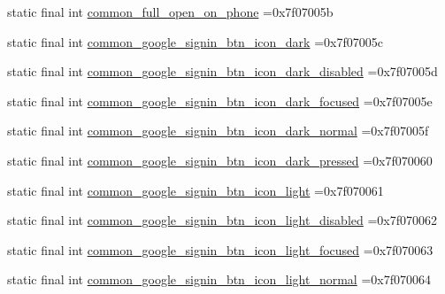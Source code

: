 \begin{DoxyCompactItemize}
\item 
static final int \mbox{\hyperlink{classbr_1_1unb_1_1cic_1_1mp_1_1marketmaster_1_1test_1_1R_1_1drawable_a0fd9e323f715b2ee193d29a30a4b9628}{common\+\_\+full\+\_\+open\+\_\+on\+\_\+phone}} =0x7f07005b
\item 
static final int \mbox{\hyperlink{classbr_1_1unb_1_1cic_1_1mp_1_1marketmaster_1_1test_1_1R_1_1drawable_a4e81f21d7930dfe892c7efd4e833a081}{common\+\_\+google\+\_\+signin\+\_\+btn\+\_\+icon\+\_\+dark}} =0x7f07005c
\item 
static final int \mbox{\hyperlink{classbr_1_1unb_1_1cic_1_1mp_1_1marketmaster_1_1test_1_1R_1_1drawable_a1639ac8cf71b2d7b25fa1ed7d373eaef}{common\+\_\+google\+\_\+signin\+\_\+btn\+\_\+icon\+\_\+dark\+\_\+disabled}} =0x7f07005d
\item 
static final int \mbox{\hyperlink{classbr_1_1unb_1_1cic_1_1mp_1_1marketmaster_1_1test_1_1R_1_1drawable_a9cd53dcba58704032d7202b8b7ce1214}{common\+\_\+google\+\_\+signin\+\_\+btn\+\_\+icon\+\_\+dark\+\_\+focused}} =0x7f07005e
\item 
static final int \mbox{\hyperlink{classbr_1_1unb_1_1cic_1_1mp_1_1marketmaster_1_1test_1_1R_1_1drawable_a68a41455bb6a98e2ff649a936f15c3b2}{common\+\_\+google\+\_\+signin\+\_\+btn\+\_\+icon\+\_\+dark\+\_\+normal}} =0x7f07005f
\item 
static final int \mbox{\hyperlink{classbr_1_1unb_1_1cic_1_1mp_1_1marketmaster_1_1test_1_1R_1_1drawable_abbcd749fab346ac0363e3a3d4db4c77a}{common\+\_\+google\+\_\+signin\+\_\+btn\+\_\+icon\+\_\+dark\+\_\+pressed}} =0x7f070060
\item 
static final int \mbox{\hyperlink{classbr_1_1unb_1_1cic_1_1mp_1_1marketmaster_1_1test_1_1R_1_1drawable_a57f7e7bc5027b7b3d146d3b31b61f484}{common\+\_\+google\+\_\+signin\+\_\+btn\+\_\+icon\+\_\+light}} =0x7f070061
\item 
static final int \mbox{\hyperlink{classbr_1_1unb_1_1cic_1_1mp_1_1marketmaster_1_1test_1_1R_1_1drawable_abb83c9c1f54501449e530a38cabb694e}{common\+\_\+google\+\_\+signin\+\_\+btn\+\_\+icon\+\_\+light\+\_\+disabled}} =0x7f070062
\item 
static final int \mbox{\hyperlink{classbr_1_1unb_1_1cic_1_1mp_1_1marketmaster_1_1test_1_1R_1_1drawable_a654075723c8bc55233d8c0001250b2e1}{common\+\_\+google\+\_\+signin\+\_\+btn\+\_\+icon\+\_\+light\+\_\+focused}} =0x7f070063
\item 
static final int \mbox{\hyperlink{classbr_1_1unb_1_1cic_1_1mp_1_1marketmaster_1_1test_1_1R_1_1drawable_a9f43bed3c84ad3448aad296f6d7caf4c}{common\+\_\+google\+\_\+signin\+\_\+btn\+\_\+icon\+\_\+light\+\_\+normal}} =0x7f070064

\end{DoxyCompactItemize}
